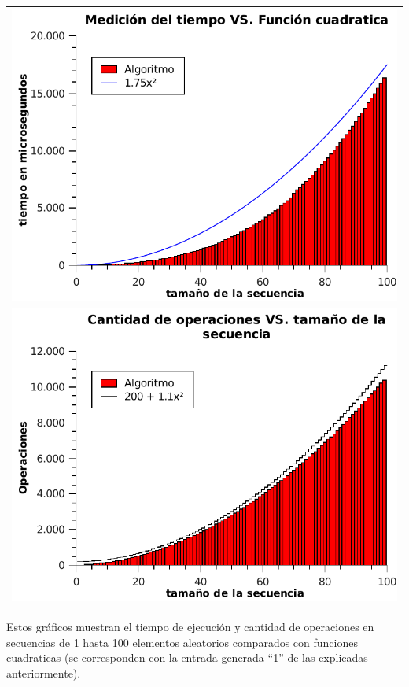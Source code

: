 \newpage
	\begin{table}[h!] %
		\centering %
			\begin{tabular}{c}
				\includegraphics[scale=0.7]{../ej1/graficos/tiempo100.pdf} \\
				\includegraphics[scale=0.7]{../ej1/graficos/operaciones100.pdf}
				\end{tabular}
				\label{tiempoEj1a} %
	\end{table}

Estos gráficos muestran el tiempo de ejecución y cantidad de operaciones en secuencias de 1 hasta 100 elementos aleatorios comparados con funciones cuadraticas (se corresponden con la entrada generada ``1''  de las explicadas anteriormente).

